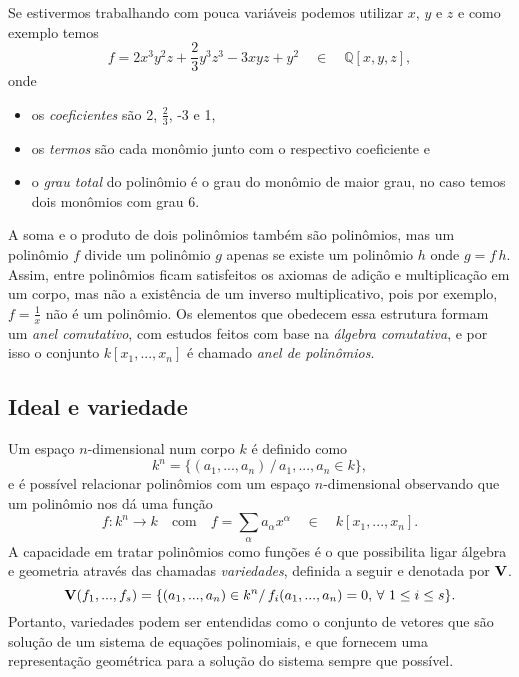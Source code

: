 Se estivermos trabalhando com pouca variáveis podemos utilizar $x$, $y$ e $z$ e como exemplo temos
\begin{equation*}
f=2x^3y^2z+\frac{2}{3}y^3z^3-3xyz+y^2\quad\in\quad\mathbb{Q}[x,y,z],
\end{equation*} 
onde
\begin{itemize}
\item os {\it coeficientes} são 2, $\frac{2}{3}$, -3 e 1,
\item os {\it termos} são cada monômio junto com o respectivo coeficiente e
\item o {\it grau total} do polinômio é o grau do monômio de maior grau, no caso temos dois monômios com grau 6.
\end{itemize}

A soma e o produto de dois polinômios também são polinômios, mas um polinômio $f$ divide um polinômio $g$ apenas se existe um polinômio $h$ onde $g=f\,h$. Assim, entre polinômios ficam satisfeitos os axiomas de adição e multiplicação em um corpo, mas não a existência de um inverso multiplicativo, pois por exemplo, $f=\frac{1}{x}$ não é um polinômio. Os elementos que obedecem essa estrutura formam um {\it anel comutativo}, com estudos feitos com base na {\it álgebra comutativa}, e por isso o conjunto $k[x_1,...,x_n]$ é chamado {\it anel de polinômios}.

\subsection*{Ideal e variedade}
Um espaço $n$-dimensional num corpo $k$ é definido como
\begin{equation*}
k^n=\{(a_1,...,a_n)\,/\, a_1,...,a_n\in k\},
\end{equation*}
e é possível relacionar polinômios com um espaço $n$-dimensional observando que um polinômio nos dá uma função
\begin{equation*}
f:k^n\rightarrow k\quad\text{com}\quad f=\sum_\alpha a_\alpha x^\alpha\quad \in\quad k[x_1,...,x_n].
\end{equation*}
A capacidade em tratar polinômios como funções é o que possibilita ligar álgebra e geometria através das chamadas {\it variedades}, definida a seguir e denotada por ${\bf V}$.
\begin{equation*}
{\bf V}(f_1,...,f_s)=\{(a_1,...,a_n)\in k^n/\, f_i(a_1,...,a_n)=0, \,\forall\,\, 1\le i\le s\}.
\end{equation*}
Portanto, variedades podem ser entendidas como o conjunto de vetores que são solução de um sistema de equações polinomiais, e que fornecem uma representação geométrica para a solução do sistema sempre que possível.


